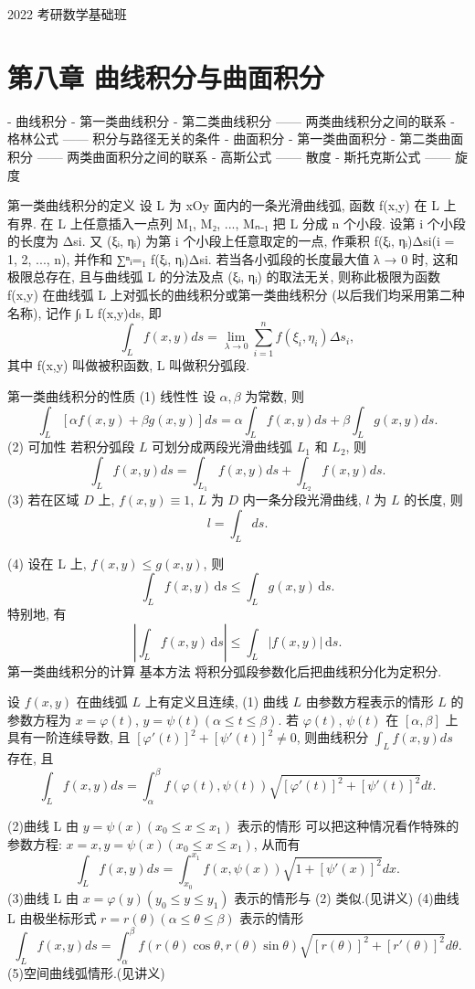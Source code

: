 2022 考研数学基础班


\section*{第八章 曲线积分与曲面积分}

- 曲线积分
- 第一类曲线积分
- 第二类曲线积分 —— 两类曲线积分之间的联系
- 格林公式 —— 积分与路径无关的条件
- 曲面积分
- 第一类曲面积分
- 第二类曲面积分 —— 两类曲面积分之间的联系
- 高斯公式 —— 散度
- 斯托克斯公式 —— 旋度

第一类曲线积分的定义
设 L 为 xOy 面内的一条光滑曲线弧, 函数 f(x,y) 在 L 上有界. 在 L 上任意插入一点列 M₁, M₂, ..., Mₙ₋₁ 把 L 分成 n 个小段. 设第 i 个小段的长度为 Δsi. 又 (ξᵢ, ηᵢ) 为第 i 个小段上任意取定的一点, 作乘积 f(ξᵢ, ηᵢ)Δsi(i = 1, 2, ..., n), 并作和 ∑ⁿᵢ=₁ f(ξᵢ, ηᵢ)Δsi. 若当各小弧段的长度最大值 λ → 0 时, 这和极限总存在, 且与曲线弧 L 的分法及点 (ξᵢ, ηᵢ) 的取法无关, 则称此极限为函数 f(x,y) 在曲线弧 L 上对弧长的曲线积分或第一类曲线积分 (以后我们均采用第二种名称), 记作 ∫ₗ L f(x,y)ds, 即
\[ \int_L f(x,y) ds = \lim_{\lambda \to 0} \sum_{i=1}^n f(\xi_i, \eta_i) \Delta s_i, \]
其中 f(x,y) 叫做被积函数, L 叫做积分弧段.

第一类曲线积分的性质
(1) 线性性 设 \(\alpha, \beta\) 为常数, 则
\[ \int_L [\alpha f(x, y) + \beta g(x, y)] ds = \alpha \int_L f(x, y) ds + \beta \int_L g(x, y) ds. \]
(2) 可加性 若积分弧段 \(L\) 可划分成两段光滑曲线弧 \(L_1\) 和 \(L_2\), 则
\[ \int_L f(x, y) ds = \int_{L_1} f(x, y) ds + \int_{L_2} f(x, y) ds. \]
(3) 若在区域 \(D\) 上, \(f(x, y) \equiv 1\), \(L\) 为 \(D\) 内一条分段光滑曲线, \(l\) 为 \(L\) 的长度, 则
\[ l = \int_L ds. \]

(4) 设在 L 上, \(f(x,y) \leq g(x,y)\), 则
\[ \int_L f(x,y) \, \mathrm{d}s \leq \int_L g(x,y) \, \mathrm{d}s. \]
特别地, 有
\[ \left| \int_L f(x,y) \, \mathrm{d}s \right| \leq \int_L |f(x,y)| \, \mathrm{d}s. \]
第一类曲线积分的计算
基本方法 将积分弧段参数化后把曲线积分化为定积分.

设 \(f(x,y)\) 在曲线弧 \(L\) 上有定义且连续,
(1) 曲线 \(L\) 由参数方程表示的情形 \(L\) 的参数方程为 \(x = \varphi(t)\), \(y = \psi(t) (\alpha \leq t \leq \beta)\). 若 \(\varphi(t)\), \(\psi(t)\) 在 \([\alpha, \beta]\) 上具有一阶连续导数, 且 \([\varphi'(t)]^2 + [\psi'(t)]^2 \neq 0\), 则曲线积分 \(\int_L f(x,y) ds\) 存在, 且
\[ \int_L f(x,y) ds = \int_\alpha^\beta f(\varphi(t), \psi(t)) \sqrt{[\varphi'(t)]^2 + [\psi'(t)]^2} dt. \]

(2)曲线 L 由 \(y = \psi(x)(x_0 \le x \le x_1)\) 表示的情形 可以把这种情况看作特殊的参数方程: \(x = x, y = \psi(x)(x_0 \le x \le x_1)\), 从而有
\[ \int_L f(x, y) ds = \int_{x_0}^{x_1} f(x, \psi(x)) \sqrt{1 + [\psi'(x)]^2} dx. \]
(3)曲线 L 由 \(x = \varphi(y)(y_0 \le y \le y_1)\) 表示的情形与 (2) 类似.(见讲义)
(4)曲线 L 由极坐标形式 \(r = r(\theta)(\alpha \le \theta \le \beta)\) 表示的情形
\[ \int_L f(x, y) ds = \int_{\alpha}^{\beta} f(r(\theta) \cos \theta, r(\theta) \sin \theta) \sqrt{[r(\theta)]^2 + [r'(\theta)]^2} d\theta. \]
(5)空间曲线弧情形.(见讲义)

